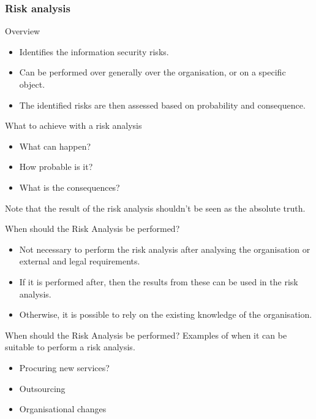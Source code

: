 \documentclass{beamer}
\begin{document}
\subsubsection{Risk analysis}
\begin{frame}{Overview}{\insertsubsubsectionhead}
  \begin{itemize}
    \item Identifies the information security risks.
    \item Can be performed over generally over the organisation, or on a
      specific object.
    \item The identified risks are then assessed based on probability and
      consequence.
  \end{itemize}
  \begin{block}{What to achieve with a risk analysis}
    \begin{itemize}
      \item What can happen?
      \item How probable is it?
      \item What is the consequences?
    \end{itemize}
    Note that the result of the risk analysis shouldn't be seen as the absolute
    truth.
  \end{block}
\end{frame}

\begin{frame}{When should the Risk Analysis be performed?}{\insertsubsubsectionhead}
  \begin{itemize}
    \item Not necessary to perform the risk analysis after analysing the
      organisation or external and legal requirements.
    \item If it is performed after, then the results from these can be used in
      the risk analysis.
    \item Otherwise, it is possible to rely on the existing knowledge of the
      organisation.
  \end{itemize}
\end{frame}
\begin{frame}{When should the Risk Analysis be performed?}{\insertsubsubsectionhead}
  Examples of when it can be suitable to perform a risk analysis.
  \begin{itemize}
    \item Procuring new services?
    \item Outsourcing
    \item Organisational changes
  \end{itemize}
\end{frame}
\end{document}
